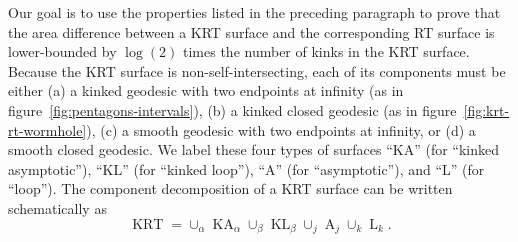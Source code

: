 \documentclass[a4paper,11pt]{article}
\newcommand{\KRT}{\operatorname{KRT}}
\newcommand{\KA}{\operatorname{KA}}
\newcommand{\KL}{\operatorname{KL}}
\newcommand{\A}{\operatorname{A}}
\renewcommand{\L}{\operatorname{L}}
\begin{document}
Our goal is to use the properties listed in the preceding paragraph to prove that the area difference between a KRT surface and the corresponding RT surface is lower-bounded by $\log(2)$ times the number of kinks in the KRT surface. Because the KRT surface is non-self-intersecting, each of its components must be either (a) a kinked geodesic with two endpoints at infinity (as in figure~\ref{fig:pentagons-intervals}), (b) a kinked closed geodesic (as in figure~\ref{fig:krt-rt-wormhole}), (c) a smooth geodesic with two endpoints at infinity, or (d) a smooth closed geodesic. We label these four types of surfaces ``KA'' (for ``kinked asymptotic''), ``KL'' (for ``kinked loop''), ``A'' (for ``asymptotic''), and ``L'' (for ``loop''). The component decomposition of a KRT surface can be written schematically as
\begin{equation}
    \KRT = \cup_{\alpha} \KA_{\alpha} \cup_{\beta} \KL_{\beta} \cup_{j} \A_{j} \cup_{k} \L_{k}.
\end{equation}
\end{document}
